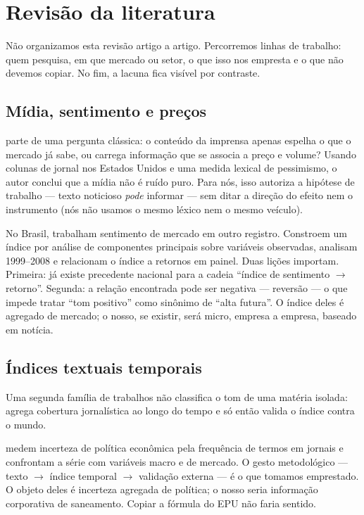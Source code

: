 \chapter{Revisão da literatura}
\label{cap:revisao}

Não organizamos esta revisão artigo a artigo. Percorremos linhas de trabalho: quem pesquisa, em que mercado ou setor, o que isso nos empresta e o que não devemos copiar. No fim, a lacuna fica visível por contraste.

\section{Mídia, sentimento e preços}

 parte de uma pergunta clássica: o conteúdo da imprensa apenas espelha o que o mercado já sabe, ou carrega informação que se associa a preço e volume? Usando colunas de jornal nos Estados Unidos e uma medida lexical de pessimismo, o autor conclui que a mídia não é ruído puro. Para nós, isso autoriza a hipótese de trabalho --- texto noticioso \emph{pode} informar --- sem ditar a direção do efeito nem o instrumento (nós não usamos o mesmo léxico nem o mesmo veículo).

No Brasil,  trabalham sentimento de mercado em outro registro. Constroem um índice por análise de componentes principais sobre variáveis observadas, analisam 1999--2008 e relacionam o índice a retornos em painel. Duas lições importam. Primeira: já existe precedente nacional para a cadeia ``índice de sentimento $\rightarrow$ retorno''. Segunda: a relação encontrada pode ser negativa --- reversão --- o que impede tratar ``tom positivo'' como sinônimo de ``alta futura''. O índice deles é agregado de mercado; o nosso, se existir, será micro, empresa a empresa, baseado em notícia.

\section{Índices textuais temporais}

Uma segunda família de trabalhos não classifica o tom de uma matéria isolada: agrega cobertura jornalística ao longo do tempo e só então valida o índice contra o mundo.

 medem incerteza de política econômica pela frequência de termos em jornais e confrontam a série com variáveis macro e de mercado. O gesto metodológico --- texto $\rightarrow$ índice temporal $\rightarrow$ validação externa --- é o que tomamos emprestado. O objeto deles é incerteza agregada de política; o nosso seria informação corporativa de saneamento. Copiar a fórmula do EPU não faria sentido.

